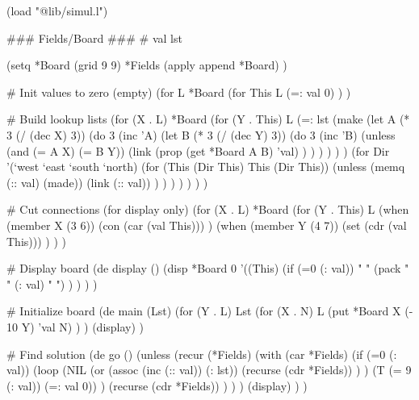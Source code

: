 \begin{wideverbatim}

(load "@lib/simul.l")

### Fields/Board ###
# val lst

(setq
   *Board (grid 9 9)
   *Fields (apply append *Board) )

# Init values to zero (empty)
(for L *Board
   (for This L
      (=: val 0) ) )

# Build lookup lists
(for (X . L) *Board
   (for (Y . This) L
      (=: lst
         (make
            (let A (* 3 (/ (dec X) 3))
               (do 3
                  (inc 'A)
                  (let B (* 3 (/ (dec Y) 3))
                     (do 3
                        (inc 'B)
                        (unless (and (= A X) (= B Y))
                           (link
                              (prop (get *Board A B) 'val) ) ) ) ) ) )
            (for Dir '(`west `east `south `north)
               (for (This (Dir This)  This  (Dir This))
                  (unless (memq (:: val) (made))
                     (link (:: val)) ) ) ) ) ) ) )

# Cut connections (for display only)
(for (X . L) *Board
   (for (Y . This) L
      (when (member X (3 6))
         (con (car (val This))) )
      (when (member Y (4 7))
         (set (cdr (val This))) ) ) )


\end{wideverbatim}

\begin{wideverbatim}

# Display board
(de display ()
   (disp *Board 0
      '((This)
         (if (=0 (: val))
            "   "
            (pack " " (: val) " ") ) ) ) )

# Initialize board
(de main (Lst)
   (for (Y . L) Lst
      (for (X . N) L
         (put *Board X (- 10 Y) 'val N) ) )
   (display) )

# Find solution
(de go ()
   (unless
      (recur (*Fields)
         (with (car *Fields)
            (if (=0 (: val))
               (loop
                  (NIL
                     (or
                        (assoc (inc (:: val)) (: lst))
                        (recurse (cdr *Fields)) ) )
                  (T (= 9 (: val)) (=: val 0)) )
               (recurse (cdr *Fields)) ) ) )
      (display) ) )


\end{wideverbatim}

